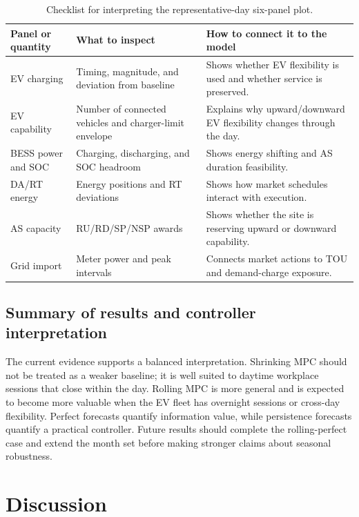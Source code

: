 \documentclass[final,5p,times]{elsarticle}
\begin{document}
\begin{table}[!t]
\centering
\caption{Checklist for interpreting the representative-day six-panel plot.}
\label{tab:repday_checklist}
\scriptsize
\begin{tabularx}{\textwidth}{@{}p{}p{}X@{}}
\toprule
Panel or quantity & What to inspect & How to connect it to the model \\
\midrule
EV charging & Timing, magnitude, and deviation from baseline & Shows whether EV flexibility is used and whether service is preserved.\\
EV capability & Number of connected vehicles and charger-limit envelope & Explains why upward/downward EV flexibility changes through the day.\\
BESS power and SOC & Charging, discharging, and SOC headroom & Shows energy shifting and AS duration feasibility.\\
DA/RT energy & Energy positions and RT deviations & Shows how market schedules interact with execution.\\
AS capacity & RU/RD/SP/NSP awards & Shows whether the site is reserving upward or downward capability.\\
Grid import & Meter power and peak intervals & Connects market actions to TOU and demand-charge exposure.\\
\bottomrule
\end{tabularx}
\end{table}

\subsection{Summary of results and controller interpretation}
The current evidence supports a balanced interpretation. Shrinking MPC should not be treated as a weaker baseline; it is well suited to daytime workplace sessions that close within the day. Rolling MPC is more general and is expected to become more valuable when the EV fleet has overnight sessions or cross-day flexibility. Perfect forecasts quantify information value, while persistence forecasts quantify a practical controller. Future results should complete the rolling-perfect case and extend the month set before making stronger claims about seasonal robustness.

\section{Discussion}
\label{sec:discussion}
\end{document}
